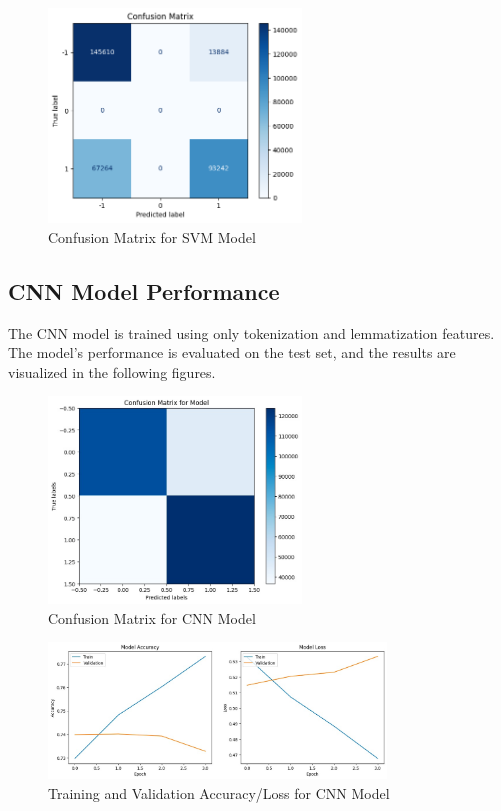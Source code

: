\documentclass[12pt]{article}
\begin{document}
\begin{figure}[H]
    \centering
    \includegraphics[width=0.6\textwidth]{svm_50epoch_tfidf.png}
    \caption{Confusion Matrix for SVM Model}
    \label{fig:accuracy}
\end{figure}

\subsection{CNN Model Performance}
The CNN model is trained using only tokenization and lemmatization features. The model's performance is evaluated on the test set, and the results are visualized in the following figures.

\begin{figure}[H]
    \centering
    \includegraphics[width=0.6\textwidth]{WhatsApp Image 2024-05-29 at 02.36.54 (1).jpeg}
    \caption{Confusion Matrix for CNN Model}
    \label{fig:cnn_confusion_matrix}
\end{figure}

\begin{figure}[H]
    \centering
    \includegraphics[width=0.8\textwidth]{WhatsApp Image 2024-05-29 at 02.37.14.jpeg}
    \caption{Training and Validation Accuracy/Loss for CNN Model}
    \label{fig:cnn_training_validation}
\end{figure}
\end{document}

